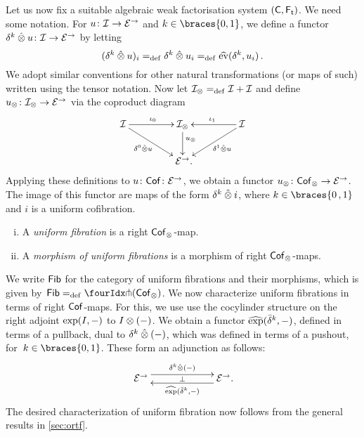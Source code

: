 \documentclass[reqno,10pt,a4paper,oneside,draft]{amsart}
\begin{document}
{{Let us now fix a suitable algebraic weak factorisation system $(\mathsf{C}, \mathsf{F_t})$. 
We need some notation. For $u \colon \mathcal{I} \to \mathcal{E}^\to$ and $k \in \braces{0, 1}$, we define a functor $\delta^k \mathbin{\hat{\otimes}} u \colon \mathcal{I} \to \mathcal{E}^\to$ by letting
\[
  (\delta^k \mathbin{\hat{\otimes}} u)_i =_{\operatorname{def}} \delta^k \mathbin{\hat{\otimes}} u_i  =_{\operatorname{def}} \widehat{\operatorname{ev}}(\delta^k, u_i) \, .
\]
We adopt similar conventions for other natural transformations (or maps of such) written using the tensor notation.
Now let $\mathcal{I}_\otimes =_{\operatorname{def}} \mathcal{I} + \mathcal{I}$ and define $u_\otimes \colon \mathcal{I}_\otimes \to \mathcal{E}^\to$ via the coproduct diagram
\begin{equation} \label{equ:u-tensor}
\begin{gathered}
\xymatrix@C+2em{
  \cal{I}
  \ar[r]^{\iota_0}
  \ar[dr]_-{\lcyl \hatotimes u}
&
  \cal{I}_\otimes
  \ar[d]^(.4){u_\otimes}
&
  \cal{I}
  \ar[dl]^-{\rcyl \hatotimes u}
  \ar[l]_{\iota_1}
\\&
  \catE^\to
\rlap{.}}
\end{gathered}
\end{equation}
Applying these definitions to $u \colon \mathsf{Cof} \colon \mathcal{E}^\to$, we obtain a functor $u_\otimes \colon \mathsf{Cof}_\otimes \to \mathcal{E}^\to$.
The image of this functor are maps of the form $\delta^k \mathbin{\hat{\otimes}} i$, where $k \in \braces{ 0 \, , 1}$ and $i$ is a uniform
cofibration.


\begin{definition} \label{def:I-fibration} \hfill 
\begin{enumerate}[(i)]
\item A \emph{uniform fibration} is a right $\mathsf{Cof}_\otimes$-map.
\item A \emph{morphism of uniform fibrations} is a morphism of right $\mathsf{Cof}_\otimes$-maps.
\end{enumerate}
\end{definition}


We write $\mathsf{Fib}$ for the category of uniform fibrations and their morphisms, which is given by~$\Fib  \defeq \liftr{(\Cof_\otimes)}$. We now characterize uniform fibrations in terms of right $\mathsf{Cof}$-maps. For this, we use use the cocylinder structure on the right adjoint $\exp(I, -)$ to $I \otimes (-)$. We obtain a functor $\operatorname{\widehat{exp}}(\bar{\delta}^k, -)$, defined in terms of a pullback, dual to $\delta^k \mathbin{\hat{\otimes}} (-)$, which was defined in terms of a pushout, for~$k \in \braces{0, 1}$. These form an adjunction as follows:
\[
\xymatrix@C+4em{
  \catE^\to
  \ar@<1ex>[r]^{\kcyl \hatotimes (-)}
  \ar@{}[r]|{\bot}
&
  \catE^\to
  \ar@<1ex>[l]^{\hatexp(\bar{\delta}^k, -)}
\rlap{.}}
\]
The desired characterization of uniform fibration now follows from the general results in \cref{sec:ortf}.

}}
\end{document}
